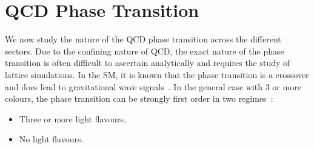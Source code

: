 \documentclass[nofootinbib,twocolumn,preprintnumbers]{revtex4-1}
\begin{document}
\section{QCD Phase Transition}
\label{sec:dQCD}
%
We now study the nature of the QCD phase transition across the different sectors. Due to the confining nature of QCD, the exact nature of the phase transition is often difficult to ascertain analytically and requires the study of lattice simulations. In the SM, it is known that the phase transition is a crossover and does lead to gravitational wave signals~\cite{Aoki:2006we,Bhattacharya:2014ara}. In the general case with 3 or more colours, the phase transition can be strongly first order in two regimes~\cite{SVETITSKY1982423,Pisarski:1983ms,Panero:2009tv}:
\begin{itemize}
\item Three or more light flavours.
\item No light flavours. 
\end{itemize}
\end{document}
